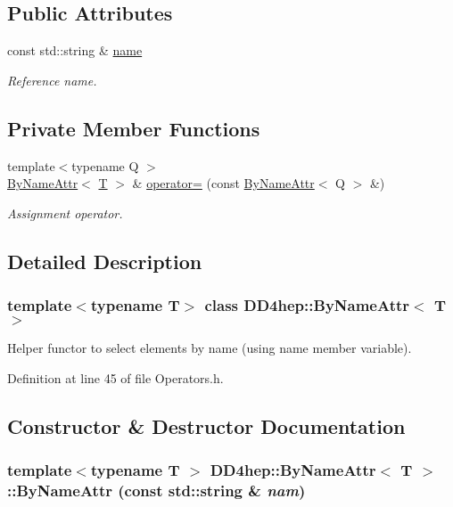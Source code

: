 \subsection*{Public Attributes}
\begin{DoxyCompactItemize}
\item 
const std::string \& \hyperlink{class_d_d4hep_1_1_by_name_attr_af7353d051e867c65d04fc7efb9975717}{name}
\begin{DoxyCompactList}\small\item\em Reference name. \item\end{DoxyCompactList}\end{DoxyCompactItemize}
\subsection*{Private Member Functions}
\begin{DoxyCompactItemize}
\item 
{\footnotesize template$<$typename Q $>$ }\\\hyperlink{class_d_d4hep_1_1_by_name_attr}{ByNameAttr}$<$ \hyperlink{class_t}{T} $>$ \& \hyperlink{class_d_d4hep_1_1_by_name_attr_ae3d9f2b875913f9b5cf884c4b4cf4863}{operator=} (const \hyperlink{class_d_d4hep_1_1_by_name_attr}{ByNameAttr}$<$ Q $>$ \&)
\begin{DoxyCompactList}\small\item\em Assignment operator. \item\end{DoxyCompactList}\end{DoxyCompactItemize}


\subsection{Detailed Description}
\subsubsection*{template$<$typename T$>$ class DD4hep::ByNameAttr$<$ T $>$}

Helper functor to select elements by name (using name member variable). 

Definition at line 45 of file Operators.h.

\subsection{Constructor \& Destructor Documentation}
\hypertarget{class_d_d4hep_1_1_by_name_attr_a69abb8e2cf258848ca9b19ef02082fde}{
\subsubsection[{ByNameAttr}]{\setlength{\rightskip}{0pt plus 5cm}template$<$typename T $>$ {\bf DD4hep::ByNameAttr}$<$ {\bf T} $>$::{\bf ByNameAttr} (const std::string \& {\em nam})}}
\label{class_d_d4hep_1_1_by_name_attr_a69abb8e2cf258848ca9b19ef02082fde}


